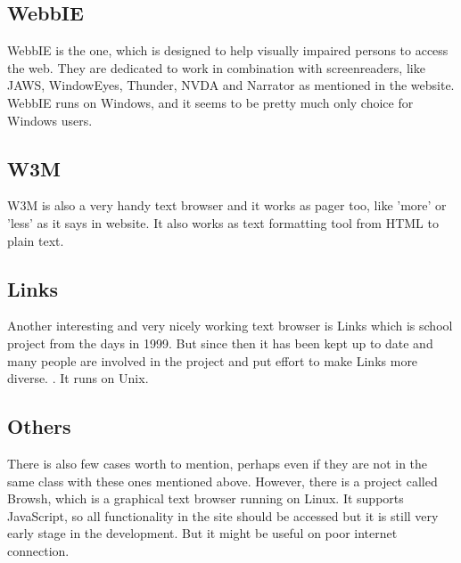 \subsection{WebbIE}
\label{tb-webbie}
WebbIE is the one, which is designed to help visually impaired persons to access the web. They are dedicated to work in combination with screenreaders, like JAWS, WindowEyes, Thunder, NVDA and Narrator as mentioned in the \textcite{webbie-main} website. WebbIE runs on Windows, and it seems to be pretty much only choice for Windows users.
\subsection{W3M}
\label{tb-w3m}
W3M is also a very handy text browser and it works as pager too, like 'more' or 'less' as it says in \textcite{w3m} website. It also works as text formatting tool from HTML to plain text.
\subsection{Links}
\label{tb-links}
Another interesting and very nicely working text browser is Links which is school project from the days in 1999. But since then it has been kept up to date and many people are involved in the project and put effort to make Links more diverse. \parencite{links}. It runs on Unix.
\subsection{Others}
\label{tb-others}
There is also few cases worth to mention, perhaps even if they are not in the same class with these ones mentioned above. However, there is a project called Browsh, which is a graphical text browser running on Linux. It supports JavaScript, so all functionality in the site should be accessed but it is still very early stage in the development. But it might be useful on poor internet connection. 

